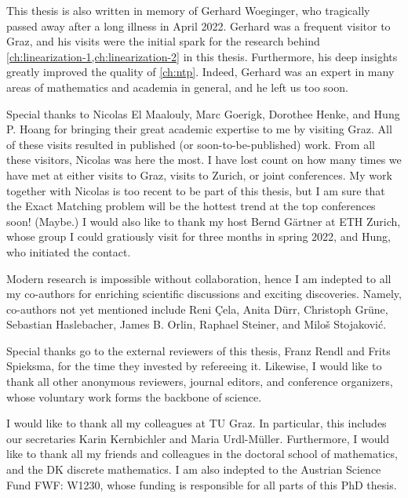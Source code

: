 \documentclass[twoside,openright,bibliography=totoc]{scrreprt}
\begin{document}
This thesis is also written in memory of Gerhard Woeginger, who tragically passed away after a long illness in April 2022. Gerhard was a frequent visitor to Graz, and his visits were the initial spark for the research behind \cref{ch:linearization-1,ch:linearization-2} in this thesis. Furthermore, his deep insights greatly improved the quality of \cref{ch:ntp}. Indeed, Gerhard was an expert in many areas of mathematics and academia in general, and he left us too soon.

Special thanks to Nicolas El Maalouly, Marc Goerigk, Dorothee Henke, and Hung P. Hoang for bringing their great academic expertise to me by visiting Graz. All of these visits resulted in published (or soon-to-be-published) work. From all these visitors, Nicolas was here the most. I have lost count on how many times we have met at either visits to Graz, visits to Zurich, or joint conferences. My work together with Nicolas is too recent to be part of this thesis, but I am sure that the Exact Matching problem will be the hottest trend at the top conferences soon! (Maybe.)
I would also like to thank my host Bernd Gärtner at ETH Zurich, whose group I could gratiously visit for three months in spring 2022, and Hung, who initiated the contact.


Modern research is impossible without collaboration, hence I am indepted to all my co-authors for enriching scientific discussions and exciting discoveries. Namely, co-authors not yet mentioned include Reni \c{C}ela, Anita Dürr, Christoph Grüne, Sebastian Haslebacher, James B. Orlin, Raphael Steiner, and Milo\v{s} Stojakovi\'{c}.

Special thanks go to the external reviewers of this thesis, Franz Rendl and Frits Spieksma, for the time they invested by refereeing it. Likewise, I would like to thank all other anonymous reviewers, journal editors, and conference organizers, whose voluntary work forms the backbone of science.

I would like to thank all my colleagues at TU Graz. In particular, this includes our secretaries Karin Kernbichler and Maria Urdl-Müller. Furthermore, I would like to thank all my friends and colleagues in the doctoral school of mathematics, and the DK discrete mathematics. I am also indepted to the Austrian Science Fund FWF: W1230, whose funding is responsible for all parts of this PhD thesis.
\end{document}
